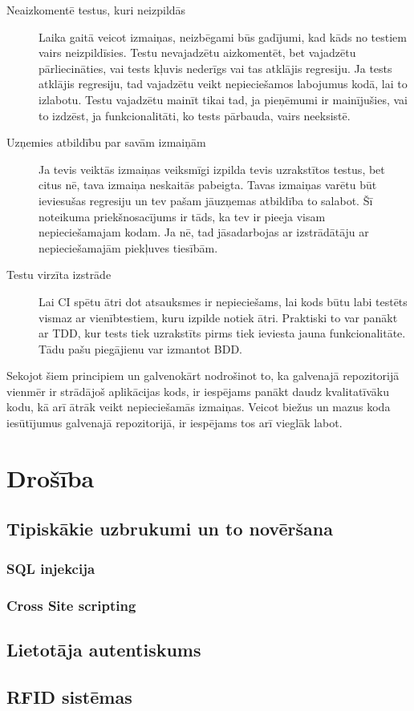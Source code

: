 \begin{description}
	\item [Neaizkomentē testus, kuri neizpildās] Laika gaitā veicot izmaiņas, neizbēgami būs gadījumi, kad kāds no testiem vairs neizpildīsies. Testu nevajadzētu aizkomentēt, bet vajadzētu pārliecināties, vai tests kļuvis nederīgs vai tas atklājis regresiju. Ja tests atklājis regresiju, tad vajadzētu veikt nepieciešamos labojumus kodā, lai to izlabotu. Testu vajadzētu mainīt tikai tad, ja pieņēmumi ir mainījušies, vai to izdzēst, ja funkcionalitāti, ko tests pārbauda, vairs neeksistē.
	\item [Uzņemies atbildību par savām izmaiņām] Ja tevis veiktās izmaiņas veiksmīgi izpilda tevis uzrakstītos testus, bet citus nē, tava izmaiņa neskaitās pabeigta. Tavas izmaiņas varētu būt ieviesušas regresiju un tev pašam jāuzņemas atbildība to salabot. Šī noteikuma priekšnosacījums ir tāds, ka tev ir pieeja visam nepieciešamajam kodam. Ja nē, tad jāsadarbojas ar izstrādātāju ar nepieciešamajām piekļuves tiesībām.
	\item [Testu virzīta izstrāde] Lai CI spētu ātri dot atsauksmes ir nepieciešams, lai kods būtu labi testēts vismaz ar vienībtestiem, kuru izpilde notiek ātri. Praktiski to var panākt ar TDD, kur tests tiek uzrakstīts pirms tiek ieviesta jauna funkcionalitāte. Tādu pašu piegājienu var izmantot BDD.
\end{description}
Sekojot šiem principiem un galvenokārt nodrošinot to, ka galvenajā repozitorijā vienmēr ir strādājoš aplikācijas kods, ir iespējams panākt daudz kvalitatīvāku kodu, kā arī ātrāk veikt nepieciešamās izmaiņas. Veicot biežus un mazus koda iesūtījumus galvenajā repozitorijā, ir iespējams tos arī vieglāk labot.


\chapter{Drošība}

\section{Tipiskākie uzbrukumi un to novēršana}
\subsection{SQL injekcija}
\subsection{Cross Site scripting}

\section{Lietotāja autentiskums}
\section{RFID sistēmas}
